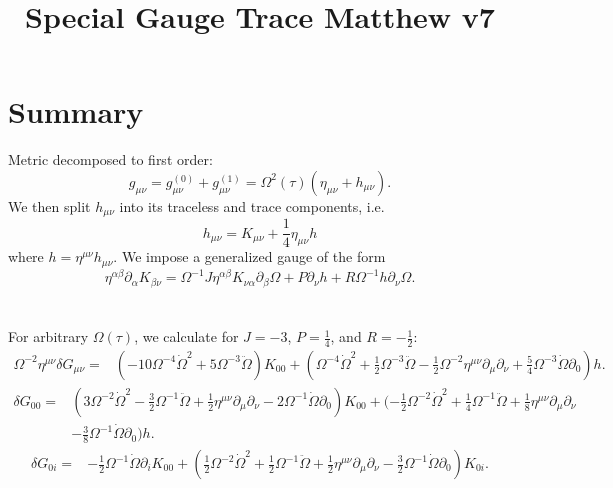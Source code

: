 \documentclass[10pt,letterpaper]{article}
\title{Special Gauge Trace Matthew v7}
\date{}
\begin{document}
\maketitle
\noindent
\section*{Summary}
Metric decomposed to first order:
\begin{equation}
g_{\mu\nu} = g^{(0)}_{\mu\nu} + g^{(1)}_{\mu\nu} = \Omega^2(\tau)(\eta_{\mu\nu}+h_{\mu\nu}).
\end{equation}
We then split $h_{\mu\nu}$ into its traceless and trace components, i.e.
\begin{equation}
	h_{\mu\nu} = K_{\mu\nu} + \frac 14 \eta_{\mu\nu}h
\end{equation}
where $h = \eta^{\mu\nu}h_{\mu\nu}$. 
We impose a generalized gauge of the form
\begin{equation}
	\eta^{\alpha\beta}\partial_{\alpha}K_{\beta\nu} = \Omega^{-1} J \eta^{\alpha\beta}K_{\nu\alpha}\partial_\beta \Omega + P \partial_\nu h + R \Omega^{-1} h \partial_\nu \Omega.
\end{equation}
\\ \\
For arbitrary $\Omega(\tau)$, we calculate for $J=-3$, $P=\tfrac14$, and $R=-\tfrac12$:
\begin{align}
\Omega^{-2}\eta^{\mu\nu}\delta G_{\mu\nu}={}&(-10 \Omega^{-4} \dot{\Omega}^2
 + 5 \Omega^{-3} \ddot{\Omega}) K_{00}
 + (\Omega^{-4} \dot{\Omega}^2
 + \tfrac{1}{2} \Omega^{-3} \ddot{\Omega}
 -  \tfrac{1}{2} \Omega^{-2} \eta^{\mu \nu} \partial_{\mu} \partial_{\nu}
 + \tfrac{5}{4} \Omega^{-3} \dot{\Omega} \partial_{0}) h.
\end{align}
\begin{align}
\delta G_{00}={}&(3 \Omega^{-2} \dot{\Omega}^2
 -  \tfrac{3}{2} \Omega^{-1} \ddot{\Omega}
 + \tfrac{1}{2} \eta^{\mu \nu} \partial_{\mu} \partial_{\nu}
 - 2 \Omega^{-1} \dot{\Omega} \partial_{0}) K_{00}
 + (- \tfrac{1}{2} \Omega^{-2} \dot{\Omega}^2
 + \tfrac{1}{4} \Omega^{-1} \ddot{\Omega}
 + \tfrac{1}{8} \eta^{\mu \nu} \partial_{\mu} \partial_{\nu}\nonumber\\
& -  \tfrac{3}{8} \Omega^{-1} \dot{\Omega} \partial_{0}) h.
\end{align}
\begin{align}
\delta G_{0i}={}&- \tfrac{1}{2} \Omega^{-1} \dot{\Omega} \partial_{i} K_{00}
 + (\tfrac{1}{2} \Omega^{-2} \dot{\Omega}^2
 + \tfrac{1}{2} \Omega^{-1} \ddot{\Omega}
 + \tfrac{1}{2} \eta^{\mu \nu} \partial_{\mu} \partial_{\nu}
 -  \tfrac{3}{2} \Omega^{-1} \dot{\Omega} \partial_{0}) K_{0i}.
\end{align}
\end{document}
